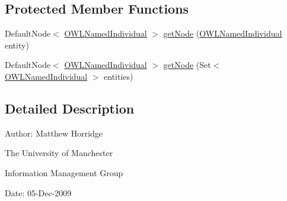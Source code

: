 \subsection*{Protected Member Functions}
\begin{DoxyCompactItemize}
\item 
Default\-Node$<$ \hyperlink{interfaceorg_1_1semanticweb_1_1owlapi_1_1model_1_1_o_w_l_named_individual}{O\-W\-L\-Named\-Individual} $>$ \hyperlink{classorg_1_1semanticweb_1_1owlapi_1_1reasoner_1_1impl_1_1_o_w_l_named_individual_node_set_af18bb4b01fbfa7cb7973ddcc42ae8fd7}{get\-Node} (\hyperlink{interfaceorg_1_1semanticweb_1_1owlapi_1_1model_1_1_o_w_l_named_individual}{O\-W\-L\-Named\-Individual} entity)
\item 
Default\-Node$<$ \hyperlink{interfaceorg_1_1semanticweb_1_1owlapi_1_1model_1_1_o_w_l_named_individual}{O\-W\-L\-Named\-Individual} $>$ \hyperlink{classorg_1_1semanticweb_1_1owlapi_1_1reasoner_1_1impl_1_1_o_w_l_named_individual_node_set_acedd5195d31a36cc892e9a85d28351cf}{get\-Node} (Set$<$ \hyperlink{interfaceorg_1_1semanticweb_1_1owlapi_1_1model_1_1_o_w_l_named_individual}{O\-W\-L\-Named\-Individual} $>$ entities)
\end{DoxyCompactItemize}


\subsection{Detailed Description}
Author\-: Matthew Horridge\par
 The University of Manchester\par
 Information Management Group\par
 Date\-: 05-\/\-Dec-\/2009 

